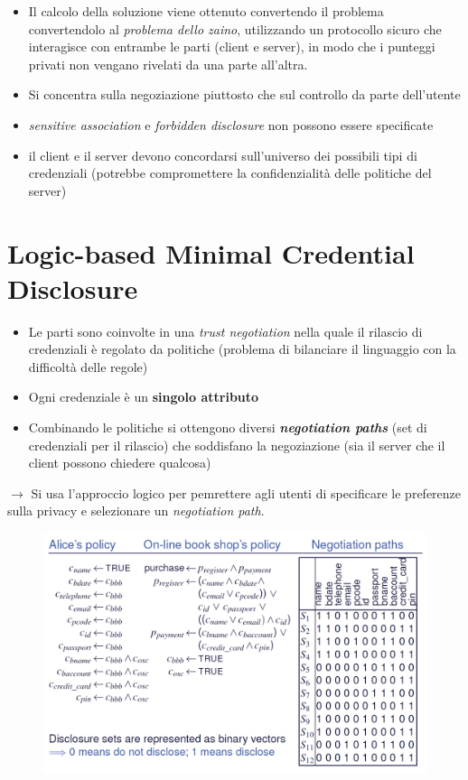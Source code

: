 \documentclass{report}
\begin{document}
\begin{itemize}
    \item Il calcolo della soluzione viene ottenuto convertendo il problema convertendolo 
    al \textit{problema dello zaino}, utilizzando un protocollo sicuro che interagisce con entrambe le parti (client e server), in modo 
    che i punteggi privati non vengano rivelati da una parte all'altra.
    \item Si concentra sulla negoziazione piuttosto che sul controllo da parte dell'utente 
    \item \textit{sensitive association} e \textit{forbidden disclosure} non possono essere specificate
    \item il client e il server devono concordarsi sull'universo dei possibili tipi di credenziali (potrebbe compromettere la confidenzialità delle politiche del server)
\end{itemize}


\chapter{Logic-based Minimal Credential Disclosure}
\begin{itemize}
    \item Le parti sono coinvolte in una \textit{trust negotiation} nella quale il rilascio di
    credenziali è regolato da politiche (problema di bilanciare il linguaggio con la difficoltà delle regole)
    \item Ogni credenziale è un \textbf{singolo attributo}
    \item Combinando le politiche si ottengono diversi \textbf{\textit{negotiation paths}} (set di credenziali per il rilascio) che soddisfano la negoziazione (sia il server che il client possono chiedere qualcosa)
\end{itemize}

$ \rightarrow $ Si usa l'approccio logico per pemrettere agli utenti di specificare le preferenze sulla privacy e selezionare un \textit{negotiation path}.

\begin{figure}[ht]
    \centering
    \includegraphics[width=0.85\linewidth]{images/logical-based minimal cred.png}
\end{figure}
\end{document}
